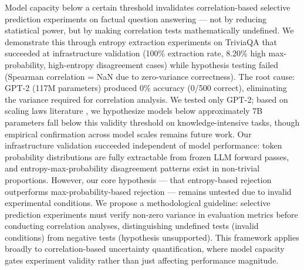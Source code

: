 Model capacity below a certain threshold invalidates correlation-based selective prediction experiments on factual question answering --- not by reducing statistical power, but by making correlation tests mathematically undefined. We demonstrate this through entropy extraction experiments on TriviaQA that succeeded at infrastructure validation (100\% extraction rate, 8.20\% high max-probability, high-entropy disagreement cases) while hypothesis testing failed (Spearman correlation = NaN due to zero-variance correctness). The root cause: GPT-2 (117M parameters) produced 0\% accuracy (0/500 correct), eliminating the variance required for correlation analysis. We tested only GPT-2; based on scaling laws literature \citep{Roberts2020}, we hypothesize models below approximately 7B parameters fall below this validity threshold on knowledge-intensive tasks, though empirical confirmation across model scales remains future work. Our infrastructure validation succeeded independent of model performance: token probability distributions are fully extractable from frozen LLM forward passes, and entropy-max-probability disagreement patterns exist in non-trivial proportions. However, our core hypothesis --- that entropy-based rejection outperforms max-probability-based rejection --- remains untested due to invalid experimental conditions. We propose a methodological guideline: selective prediction experiments must verify non-zero variance in evaluation metrics before conducting correlation analyses, distinguishing undefined tests (invalid conditions) from negative tests (hypothesis unsupported). This framework applies broadly to correlation-based uncertainty quantification, where model capacity gates experiment validity rather than just affecting performance magnitude.
